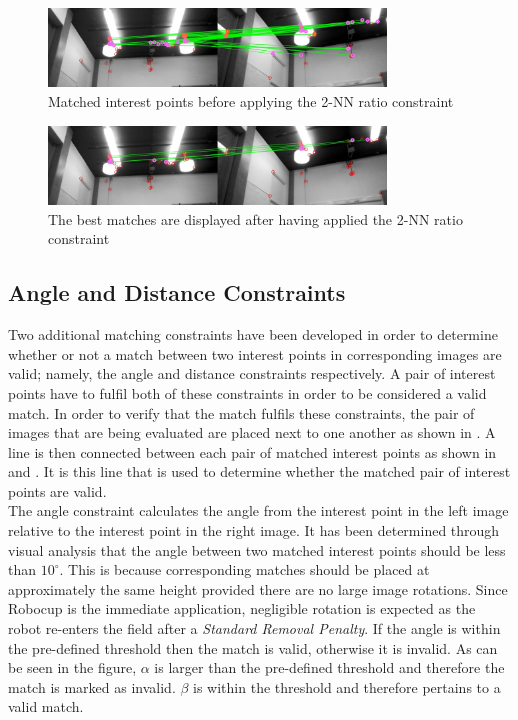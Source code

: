 \begin{figure}[h!] 
  \centering
    \includegraphics[width=0.8\textwidth]{../Drawings/Matching/feature_matching/dataset_2nn_matching_constraint_before.jpg}
    \caption{Matched interest points before applying the 2-NN ratio constraint}
    \label{fig:2nn_1}
\end{figure}

\begin{figure}[h!] 
  \centering
    \includegraphics[width=0.8\textwidth]{../Drawings/Matching/feature_matching/dataset_2nn_matching_constraint_after.jpg}
    \caption{The best matches are displayed after having applied the 2-NN ratio constraint}
    \label{fig:2nn_2}
\end{figure}


\subsection{Angle and Distance Constraints}
\label{sec:angleDistanceConstraints}
Two additional matching constraints have been developed in order to determine whether or not a match between two interest points in corresponding images are valid; namely, the angle and distance constraints respectively. A pair of interest points have to fulfil both of these constraints in order to be considered a valid match. In order to verify that the match fulfils these constraints, the pair of images that are being evaluated are placed next to one another as shown in . A line is then connected between each pair of matched interest points as shown in  and . It is this line that is used to determine whether the matched pair of interest points are valid.\\

The angle constraint calculates the angle from the interest point in the left image relative to the interest point in the right image. It has been determined through visual analysis that the angle between two matched interest points should be less than  $10^{\circ}$. This is because corresponding matches should be placed at approximately the same height provided there are no large image rotations. Since Robocup is the immediate application, negligible rotation is expected as the robot re-enters the field after a \textit{Standard Removal Penalty}.
If the angle is within the pre-defined threshold then the match is valid, otherwise it is invalid. As can be seen in the figure, $\alpha$ is larger than the pre-defined threshold and therefore the match is marked as invalid. $\beta$ is within the threshold and therefore pertains to a valid match. \\

